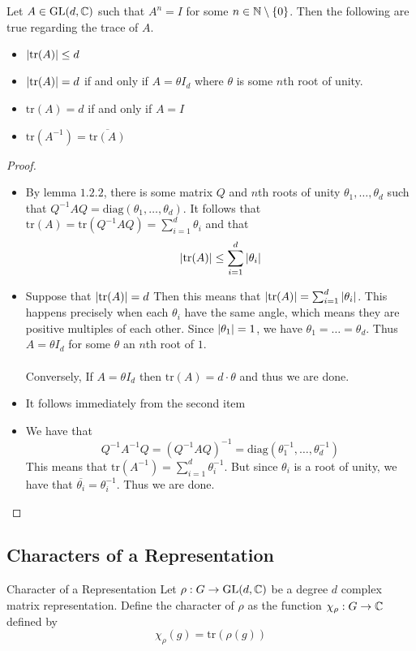 \documentclass[a4paper]{article}
\begin{document}
\begin{lmm}{}{} Let $A\in\operatorname{GL}(d,\mathbb{C})$ such that $A^n=I$ for some $n\in\mathbb{N}\setminus\{0\}$. Then the following are true regarding the trace of $A$. 
\begin{itemize}
\item $\abs{\text{tr}(A)}\leq d$
\item $\abs{\text{tr}(A)}=d$ if and only if $A=\theta I_d$ where $\theta$ is some $n$th root of unity. 
\item $\text{tr}(A)=d$ if and only if $A=I$
\item $\text{tr}(A^{-1})=\overline{\text{tr}(A)}$
\end{itemize} \tcbline
\begin{proof}~\\
\begin{itemize}
\item By lemma $1.2.2$, there is some matrix $Q$ and $n$th roots of unity $\theta_1,\dots,\theta_d$ such that $Q^{-1}AQ=\text{diag}(\theta_1,\dots,\theta_d)$. It follows that $\text{tr}(A)=\text{tr}(Q^{-1}AQ)=\sum_{i=1}^d\theta_i$ and that $$\abs{\text{tr}(A)}\leq\sum_{i=1}^d\abs{\theta_i}$$
\item Suppose that $\abs{\text{tr}(A)}=d$ Then this means that $\abs{\text{tr}(A)}=\sum_{i=1}^d\abs{\theta_i}$. This happens precisely when each $\theta_i$ have the same angle, which means they are positive multiples of each other. Since $\abs{\theta_1}=1$, we have $\theta_1=\dots=\theta_d$. Thus $A=\theta I_d$ for some $\theta$ an $n$th root of $1$. \\~\\
Conversely, If $A=\theta I_d$ then $\text{tr}(A)=d\cdot\theta$ and thus we are done. 
\item It follows immediately from the second item
\item We have that $$Q^{-1}A^{-1}Q=(Q^{-1}AQ)^{-1}=\text{diag}(\theta_1^{-1},\dots,\theta_d^{-1})$$ This means that $\text{tr}(A^{-1})=\sum_{i=1}^d\theta_i^{-1}$. But since $\theta_i$ is a root of unity, we have that $\overline{\theta_i}=\theta_i^{-1}$. Thus we are done. 
\end{itemize}
\end{proof}
\end{lmm}

\subsection{Characters of a Representation}
\begin{defn}{Character of a Representation}{} Let $\rho:G\to\operatorname{GL}(d,\mathbb{C})$ be a degree $d$ complex matrix representation. Define the character of $\rho$ as the function $\chi_\rho:G\to\mathbb{C}$ defined by $$\chi_\rho(g)=\text{tr}(\rho(g))$$
\end{defn}
\end{document}
